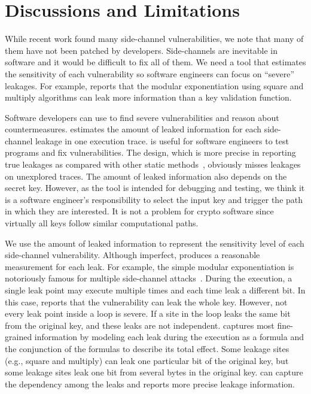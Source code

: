 \section{Discussions and Limitations}
While recent work found many side-channel vulnerabilities, 
we note that many of them have not been patched by developers.
Side-channels are inevitable in software and it would be difficult to fix all of them. 
We need a
tool that estimates the sensitivity of each vulnerability
so software engineers can focus on
``severe'' leakages. For example, \tool{} reports that 
the modular exponentiation using square and multiply algorithms can
leak more information than a key validation function.

Software developers can use \tool{} to find severe vulnerabilities
and reason about countermeasures.
\tool{} estimates the amount of leaked information for each side-channel leakage
in one execution trace. \tool{} is useful for software
engineers to test programs and fix vulnerabilities.
The design, which is more precise in reporting true leakages as compared with other static
methods~\cite{197207,BacelarAlmeida:2013:FVS:2483313.2483334}, obviously misses
leakages on unexplored traces. The amount of leaked information also depends on the secret key.
However, as the tool is intended for debugging and testing,
we think it is a software engineer's responsibility to select the input key and trigger 
the path in which they are interested. It is not a problem for crypto software 
since virtually all keys follow similar computational paths.

We use the amount of leaked information to represent the sensitivity level of 
each side-channel vulnerability. Although imperfect, \tool{} produces a reasonable 
measurement for each leak. For example, the simple modular exponentiation is 
notoriously famous for multiple side-channel attacks~\cite{kocher1996timing}. 
During the execution, a single leak point may execute multiple times
and each time leak a different bit. In this case, \tool{} reports that the 
vulnerability can leak the whole key. However, not every leak point inside a 
loop is severe. If a site in the loop leaks the same bit from the 
original key, and these leaks are not independent. \tool{} captures most 
fine-grained information by modeling each leak during the execution as a 
formula and the conjunction of the formulas to describe its total effect. 
Some leakage sites (e.g., square and multiply) 
can leak one particular bit of the original key, but some leakage sites leak one bit 
from several bytes in the original key. \tool{} can capture the dependency among the leaks and
reports more precise leakage information.

